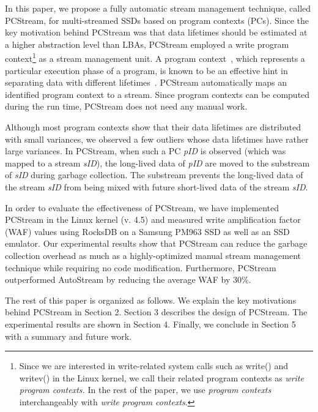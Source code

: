 In this paper, we propose a fully automatic stream management technique, called {\sf PCStream}, 
for multi-streamed SSDs based on program contexts (PCs).
Since the key motivation behind {\sf PCStream} was 
that data lifetimes should be estimated at a higher abstraction level than LBAs, 
{\sf PCStream} employed a write program context\footnote{Since we are interested in write-related 
system calls such as write() and writev() in the Linux kernel, 
we call their related program contexts as 
{\it write program contexts.} In the rest of the paper, we use 
{\it program contexts} interchangeably with {\it write program contexts}.}  
as a stream management unit.
A program context~\cite{PC}, which represents a particular execution phase of a program, 
is known to be an effective hint in separating data with different lifetimes~\cite{PCHa}.  
{\sf PCStream} automatically maps an identified program context to a stream.  
Since program contexts can be computed during the run time, 
{\sf PCStream} does not need any manual work.   

Although most program contexts show that their data lifetimes are 
distributed with small variances, we observed a few outliers 
whose data lifetimes have rather large variances.
In {\sf PCStream}, 
when such a PC {\it pID} is observed (which was mapped to a stream {\it sID}), 
the long-lived data of {\it pID} are moved to the substream of {\it sID}
during garbage collection.  
The substream prevents the long-lived data of the stream {\it sID} 
from being mixed with future short-lived data of the stream {\it sID}.

In order to evaluate the effectiveness of {\sf PCStream}, 
we have implemented {\sf PCStream}
in the Linux kernel (v. 4.5) and measured write amplification factor (WAF) values 
using RocksDB on a Samsung PM963 SSD 
as well as an SSD emulator.
Our experimental results show that {\sf PCStream}
can reduce the garbage collection overhead as much as a highly-optimized 
manual stream management technique while requiring no code modification.  
Furthermore, PCStream outperformed AutoStream by reducing the average WAF by 30\%.

The rest of this paper is organized as follows. 
We explain the key motivations behind {\sf PCStream} in Section 2. 
Section 3 describes 
the design of {\sf PCStream}.
The experimental results are shown in Section 4. 
Finally, we conclude in Section 5 with a summary and future work. 

